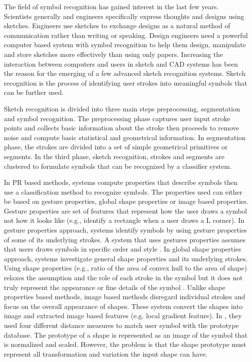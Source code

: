 \documentclass[preprint,1p,times,review]{elsarticle}
\begin{document}
 The field of symbol recognition has gained interest in the last few years. Scientists generally and engineers specifically express thoughts and designs using sketches. Engineers use sketches to exchange designs as a natural method of communication rather than writing or speaking. Design engineers need a powerful computer based system with symbol recognition to help them design, manipulate and store sketches more effectively than using only papers. Increasing the interaction between computers and users in sketch and CAD systems has been the reason for the emerging of a few advanced sketch recognition systems. Sketch recognition is the process of identifying user strokes into meaningful symbols that can be further used.

 Sketch recognition is divided into three main steps preprocessing, segmentation and symbol recognition. The preprocessing phase captures user input stroke points and collects basic information about the stroke then proceeds to remove noise and compute basic statistical and geometrical information. In segmentation phase, the strokes are divided into a set of simple geometrical primitives or segments. In the third phase, sketch recognition, strokes and segments are clustered to formulate symbols that can be recognized by a classifier system.



In PR based methods, systems compute properties that describe symbols then use a classification method to recognize symbols. The properties used can either be based on gesture properties, global shape properties or image based properties. Gesture properties are set of features that represent how the user draws a symbol not how it looks like (e.g., identify a rectangle when a user draws a L corner). In gesture properties approach, systems identify symbols by using gesture properties of some of its underlying strokes. A system that uses gestures properties assumes that users draws symbols in specific order and style \cite{gestureexample12,aideddesgin22}. In global shape properties approach, systems investigate general shape properties and its underlying strokes. Using shape properties (e.g., ratio of the area of convex hull to the area of shape) relaxes the assumption and the role of each stroke in the symbol but it does not truly represent the appearance or fine details of the symbol \cite{DiagramOfflineConvexHull,Cali63}. Unlike shape properties based methods, image based methods disregard individual strokes and focus on the overall appearance of shapes. These system convert the shapes into image and extracted image based features (e.g. local gradient feature)\cite{Oltmans07,imagetrainable48}. In \cite{imagetrainable48}, they used four different distance measures to match user symbol with the prototype database. The prototype of a shape is represented as an image of the symbol that is normalized and scaled.  However, the problem is that the shape prototype must represent all transformation and variation the input shape can have.   %
\end{document}

